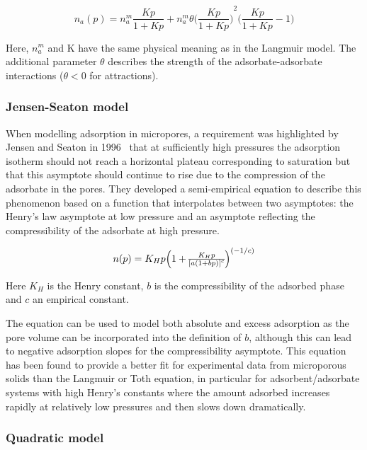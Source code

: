 \begin{equation}\label{pyg:eqn:temkin}
	n_a(p) = n_a^m \frac{Kp}{1+Kp} + n_a^m \theta
	{\Big(\frac{Kp}{1+Kp}\Big)}^2 \Big(\frac{Kp}{1+Kp} -1\Big)
\end{equation}

Here, \(n_a^m\) and K have the same physical meaning as in the
Langmuir model.
The additional parameter \(\theta\) describes the strength of the
adsorbate-adsorbate
interactions (\(\theta < 0\) for attractions).

\subsubsection{Jensen-Seaton model}\label{pyg:models:jseaton}

When modelling adsorption in micropores, a requirement was
highlighted by
Jensen and Seaton in 1996~\cite{jensenIsothermEquationAdsorption1996}
that at sufficiently high pressures the adsorption
isotherm should not reach a horizontal plateau corresponding to
saturation but
that this asymptote should continue to rise due to the compression
of the adsorbate in the pores. They developed a semi-empirical
equation
to describe this phenomenon based on a function that interpolates
between
two asymptotes: the Henry’s law asymptote at low pressure and an
asymptote reflecting the compressibility of the adsorbate at
high pressure.

\begin{equation}\label{pyg:eqn:jseaton}
	n(p) = K_H p \Big{(1 + \frac{K_H p}{{[a {(1 + b
									p)}]}^c}\Big)}^{(-1/c)}
\end{equation}

Here \(K_H\) is the Henry constant, \(b\) is the compressibility of
the
adsorbed phase and \(c\) an empirical constant.

The equation can be used to model both absolute and excess adsorption
as the pore
volume can be incorporated into the definition of \(b\), although
this can lead
to negative adsorption slopes for the compressibility asymptote.
This equation has been found to provide a better fit for experimental
data
from microporous solids than the Langmuir or Toth equation, in
particular for
adsorbent/adsorbate systems with high Henry’s constants where the
amount adsorbed
increases rapidly at relatively low pressures and then slows down
dramatically.

\subsubsection{Quadratic model}\label{pyg:models:quadratic}

